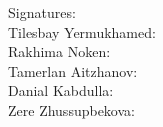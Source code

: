 \documentclass[11pt]{article}
\begin{document}
\vspace{18pt}
\noindent Signatures:\\[10pt]
\noindent Tilesbay Yermukhamed: \makebox[4.2cm]{\hrulefill}\\[16pt]
\noindent Rakhima Noken: \makebox[4.2cm]{\hrulefill}\\[16pt]
\noindent Tamerlan Aitzhanov: \makebox[4.2cm]{\hrulefill}\\[16pt]
\noindent Danial Kabdulla: \makebox[4.2cm]{\hrulefill}\\[16pt]
\noindent Zere Zhussupbekova: \makebox[4.2cm]{\hrulefill}
\end{document}
